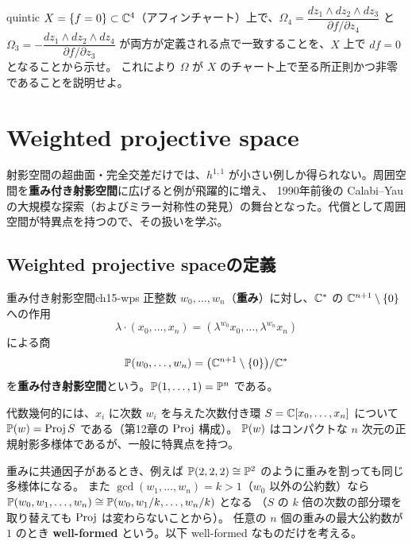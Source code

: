 quintic $X = \{f=0\}\subset\mathbb{C}^4$（アフィンチャート）上で、$\Omega_4 = \dfrac{dz_1\wedge dz_2\wedge dz_3}{\partial f/\partial z_4}$ と
$\Omega_3 = -\dfrac{dz_1\wedge dz_2\wedge dz_4}{\partial f/\partial z_3}$ が両方が定義される点で一致することを、$X$ 上で $df = 0$ となることから示せ。
これにより $\Omega$ が $X$ のチャート上で至る所正則かつ非零であることを説明せよ。

\section{Weighted projective space}

射影空間の超曲面・完全交差だけでは、$h^{1,1}$ が小さい例しか得られない。周囲空間を\textbf{重み付き射影空間}に広げると例が飛躍的に増え、
1990年前後の Calabi--Yau の大規模な探索（およびミラー対称性の発見）の舞台となった。代償として周囲空間が特異点を持つので、その扱いを学ぶ。

\subsection{Weighted projective spaceの定義}

\begin{mydef}{重み付き射影空間}{ch15-wps}
正整数 $w_0,\dots,w_n$（\textbf{重み}）に対し、$\mathbb{C}^*$ の $\mathbb{C}^{n+1}\setminus\{0\}$ への作用
\[
\lambda\cdot(x_0,\dots,x_n) = (\lambda^{w_0}x_0,\dots,\lambda^{w_n}x_n)
\]
による商
\[
\mathbb{P}(w_0,\dots,w_n) = \big(\mathbb{C}^{n+1}\setminus\{0\}\big)/\mathbb{C}^*
\]
を\textbf{重み付き射影空間}という。$\mathbb{P}(1,\dots,1) = \mathbb{P}^n$ である。
\end{mydef}

代数幾何的には、$x_i$ に次数 $w_i$ を与えた次数付き環 $S = \mathbb{C}[x_0,\dots,x_n]$ について $\mathbb{P}(w) = \operatorname{Proj} S$ である（第12章の $\operatorname{Proj}$ 構成）。
$\mathbb{P}(w)$ はコンパクトな $n$ 次元の正規射影多様体であるが、一般に特異点を持つ。

\begin{note}
重みに共通因子があるとき、例えば $\mathbb{P}(2,2,2)\cong\mathbb{P}^2$ のように重みを割っても同じ多様体になる。
また $\gcd(w_1,\dots,w_n) = k > 1$（$w_0$ 以外の公約数）なら $\mathbb{P}(w_0,w_1,\dots,w_n)\cong\mathbb{P}(w_0,w_1/k,\dots,w_n/k)$ となる
（$S$ の $k$ 倍の次数の部分環を取り替えても $\operatorname{Proj}$ は変わらないことから）。
任意の $n$ 個の重みの最大公約数が $1$ のとき \textbf{well-formed} という。以下 well-formed なものだけを考える。
\end{note}


